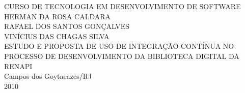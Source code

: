 \begin{titlepage}
 \begin{figure}[ht]
 \centering
 \end{figure}
 \begin{center}
   {\large CURSO DE TECNOLOGIA EM DESENVOLVIMENTO DE SOFTWARE} \\ [3.5cm]
   {\large HERMAN DA ROSA CALDARA} \\
   {\large RAFAEL DOS SANTOS GONÇALVES} \\
   {\large VINÍCIUS DAS CHAGAS SILVA} \\ [4cm]
   {\large ESTUDO E PROPOSTA DE USO DE INTEGRAÇÃO CONTÍNUA NO PROCESSO DE DESENVOLVIMENTO DA BIBLIOTECA DIGITAL DA RENAPI} \\
   \vfill
   {\large Campos dos Goytacazes/RJ} \\
   {\large 2010}
 \end{center}
\end{titlepage}


